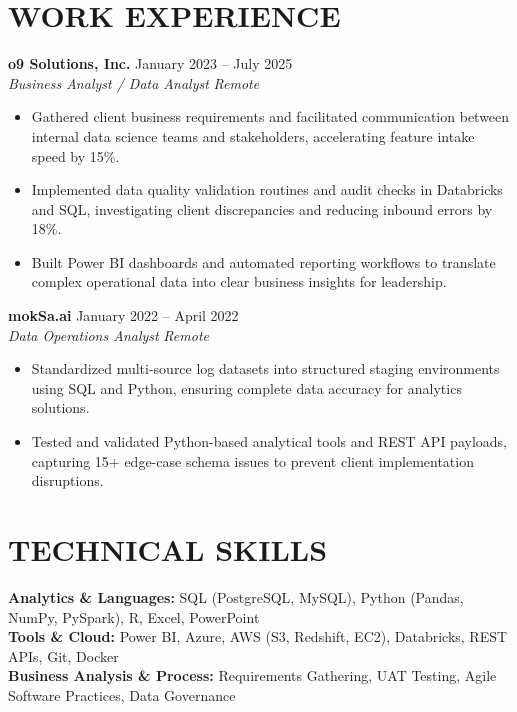\documentclass[11pt,letterpaper]{article}
\begin{document}
\section*{WORK EXPERIENCE}
\noindent\small \textbf{o9 Solutions, Inc.} \hfill January 2023 -- July 2025 \\
\textit{Business Analyst / Data Analyst} \hfill \textit{Remote}
\begin{itemize}
\item Gathered client business requirements and facilitated communication between internal data science teams and stakeholders, accelerating feature intake speed by 15\%.
\item Implemented data quality validation routines and audit checks in Databricks and SQL, investigating client discrepancies and reducing inbound errors by 18\%.
\item Built Power BI dashboards and automated reporting workflows to translate complex operational data into clear business insights for leadership.
\end{itemize}
\noindent\small \textbf{mokSa.ai} \hfill January 2022 -- April 2022 \\
\textit{Data Operations Analyst} \hfill \textit{Remote}
\begin{itemize}
\item Standardized multi-source log datasets into structured staging environments using SQL and Python, ensuring complete data accuracy for analytics solutions.
\item Tested and validated Python-based analytical tools and REST API payloads, capturing 15+ edge-case schema issues to prevent client implementation disruptions.
\end{itemize}
\section*{TECHNICAL SKILLS}
\noindent\small \textbf{Analytics \& Languages:} SQL (PostgreSQL, MySQL), Python (Pandas, NumPy, PySpark), R, Excel, PowerPoint \\
\textbf{Tools \& Cloud:} Power BI, Azure, AWS (S3, Redshift, EC2), Databricks, REST APIs, Git, Docker \\
\textbf{Business Analysis \& Process:} Requirements Gathering, UAT Testing, Agile Software Practices, Data Governance
\end{document}
